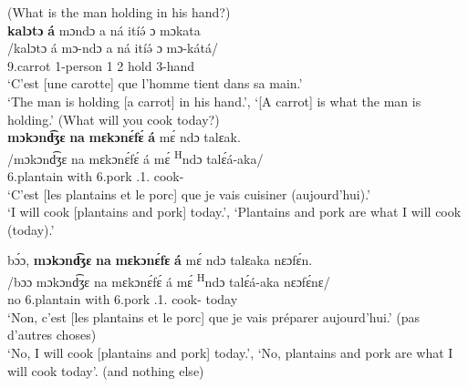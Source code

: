 \documentclass[output=paper,colorlinks,citecolor=brown
]{langscibook}
\begin{document}
\ea
\label{carrotholdclefft}
(What is the man holding in his hand?) \\ 
\glll
{\db}\textbf{kalɔtɔ} \textbf{á} mɔndɔ a ná itíə́ ɔ mɔkata \\
/kalɔtɔ á mɔ-ndɔ a ná itíə́ ɔ mɔ-kátá/ \\
{\db}9.carrot \COP{} 1-person  1\SM{} \PST{}2{} hold \PREP{} 3-hand \\
\glt
`C'est [une carotte]\textsubscript{\FOC{}} que l'homme tient dans sa main.' \\ `The man is holding [a carrot]\textsubscript{\FOC{}} in his hand.', `[A carrot]\textsubscript{\FOC{}} is what the man is holding.'  \jambox*{[JO 1624] }
\z
\ea
\label{cookppcleft}
(What will you cook today?) \\ 
\glll
{\db}\textbf{mɔkɔnd͡ʒɛ} \textbf{na} \textbf{mɛkɔnɛ́fɛ́} \textbf{á} mɛ́ ndɔ talɛak. \\
/mɔkɔnd͡ʒɛ na mɛkɔnɛ́fɛ́ á mɛ́ \textsuperscript{H}ndɔ talɛ́á-aka/ \\
{\db}6.plantain with 6.pork \COP{} \SM{}.1\SG{}.\REL{} \PRS{} cook-\DUR{} \\
\glt
`C'est [les plantains et le porc]\textsubscript{\FOC{}} que je vais cuisiner (aujourd'hui).' \\ `I will cook [plantains and pork]\textsubscript{\FOC{}} today.', `Plantains and pork are what I will cook (today).' \jambox*{[PM 1512 (+ JO 1602)] }

\z

\ea
\label{correctiveplantainsonly}
\glll
{\db}bɔ́ɔ, \textbf{mɔkɔnd͡ʒɛ} \textbf{na} \textbf{mɛkɔnɛ́fɛ} \textbf{á} mɛ́ ndɔ talɛaka nɛɔfɛ́n. \\
/bɔɔ mɔkɔnd͡ʒɛ na mɛkɔnɛ́fɛ́ á mɛ́ \textsuperscript{H}ndɔ talɛ́á-aka nɛɔfɛ́nɛ/ \\
{\db}no 6.plantain with 6.pork \COP{} \SM{}.1\SG{}.\REL{} \PRS{} cook-\DUR{} today \\
\glt
`Non, c'est [les plantains et le porc]\textsubscript{\FOC{}} que je vais préparer aujourd'hui.' (pas d'autres choses) \\ `No, I will cook [plantains and pork]\textsubscript{\FOC{}} today.', `No, plantains and pork are what I will cook today'. (and nothing else) \jambox*{[PM 1516] }

\z
\end{document}
